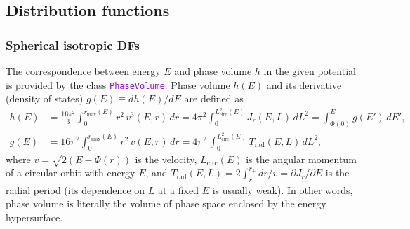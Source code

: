 \documentclass[12pt]{article}
\newcommand{\ttt}[1]{\textcolor{darkviolet}{\texttt{#1}}}
\renewcommand{\d}{\partial}
\begin{document}
\subsection{Distribution functions}  \label{sec:DFdetails}

\subsubsection{Spherical isotropic DFs}  \label{sec:DFsphericalDetails}

The correspondence between energy $E$ and phase volume $h$ in the given potential is provided by the class \ttt{PhaseVolume}. Phase volume $h(E)$ and its derivative (density of states) $g(E)\equiv dh(E)/dE$ are defined as
\begin{subequations}
\begin{align}
h(E) &= \frac{16\pi^2}3 \int_0^{r_\mathrm{max}(E)} r^2\, v^3(E,r)\, dr =
  4\pi^2\int_0^{L^2_\mathrm{circ}(E)} J_r(E,L)\,dL^2 =
  \int_{\Phi(0)}^E g(E')\, dE' ,\\
g(E) &= 16\pi^2 \int_0^{r_\mathrm{max}(E)} r^2\, v(E,r)\, dr =
  4\pi^2\, \int_0^{L_\mathrm{circ}^2(E)} T_\mathrm{rad}(E,L)\,dL^2,
\end{align}
\end{subequations}
where  $v = \sqrt{2(E-\Phi(r))}$ is the velocity,  $L_\mathrm{circ}(E)$ is the angular momentum of a circular orbit with energy $E$,  and  $T_\mathrm{rad}(E,L) = 2 \int_{r_-}^{r_+} dr/v = \d J_r/\d E$  is the radial period (its dependence on $L$ at a fixed $E$ is usually weak).
In other words, phase volume is literally the volume of phase space enclosed by the energy hypersurface.
\end{document}
